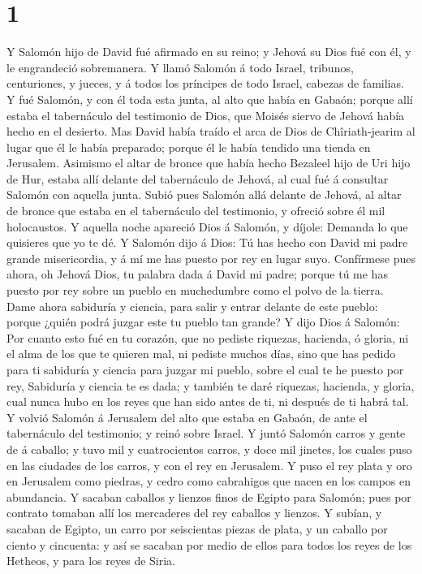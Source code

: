 \hypertarget{section}{%
\section{1}\label{section}}

 Y Salomón hijo de David fué afirmado en su reino; y
Jehová su Dios fué con él, y le engrandeció sobremanera. 
Y llamó Salomón á todo Israel, tribunos, centuriones, y jueces, y á
todos los príncipes de todo Israel, cabezas de familias. 
Y fué Salomón, y con él toda esta junta, al alto que había en Gabaón;
porque allí estaba el tabernáculo del testimonio de Dios, que Moisés
siervo de Jehová había hecho en el desierto.  Mas David
había traído el arca de Dios de Chîriath-jearim al lugar que él le había
preparado; porque él le había tendido una tienda en Jerusalem.
 Asimismo el altar de bronce que había hecho Bezaleel hijo
de Uri hijo de Hur, estaba allí delante del tabernáculo de Jehová, al
cual fué á consultar Salomón con aquella junta.  Subió
pues Salomón allá delante de Jehová, al altar de bronce que estaba en el
tabernáculo del testimonio, y ofreció sobre él mil holocaustos.
 Y aquella noche apareció Dios á Salomón, y díjole:
Demanda lo que quisieres que yo te dé.  Y Salomón dijo á
Dios: Tú has hecho con David mi padre grande misericordia, y á mí me has
puesto por rey en lugar suyo.  Confírmese pues ahora, oh
Jehová Dios, tu palabra dada á David mi padre; porque tú me has puesto
por rey sobre un pueblo en muchedumbre como el polvo de la tierra.
 Dame ahora sabiduría y ciencia, para salir y entrar
delante de este pueblo: porque ¿quién podrá juzgar este tu pueblo tan
grande?  Y dijo Dios á Salomón: Por cuanto esto fué en tu
corazón, que no pediste riquezas, hacienda, ó gloria, ni el alma de los
que te quieren mal, ni pediste muchos días, sino que has pedido para ti
sabiduría y ciencia para juzgar mi pueblo, sobre el cual te he puesto
por rey,  Sabiduría y ciencia te es dada; y también te
daré riquezas, hacienda, y gloria, cual nunca hubo en los reyes que han
sido antes de ti, ni después de ti habrá tal.  Y volvió
Salomón á Jerusalem del alto que estaba en Gabaón, de ante el
tabernáculo del testimonio; y reinó sobre Israel.  Y
juntó Salomón carros y gente de á caballo; y tuvo mil y cuatrocientos
carros, y doce mil jinetes, los cuales puso en las ciudades de los
carros, y con el rey en Jerusalem.  Y puso el rey plata y
oro en Jerusalem como piedras, y cedro como cabrahigos que nacen en los
campos en abundancia.  Y sacaban caballos y lienzos finos
de Egipto para Salomón; pues por contrato tomaban allí los mercaderes
del rey caballos y lienzos.  Y subían, y sacaban de
Egipto, un carro por seiscientas piezas de plata, y un caballo por
ciento y cincuenta: y así se sacaban por medio de ellos para todos los
reyes de los Hetheos, y para los reyes de Siria.


